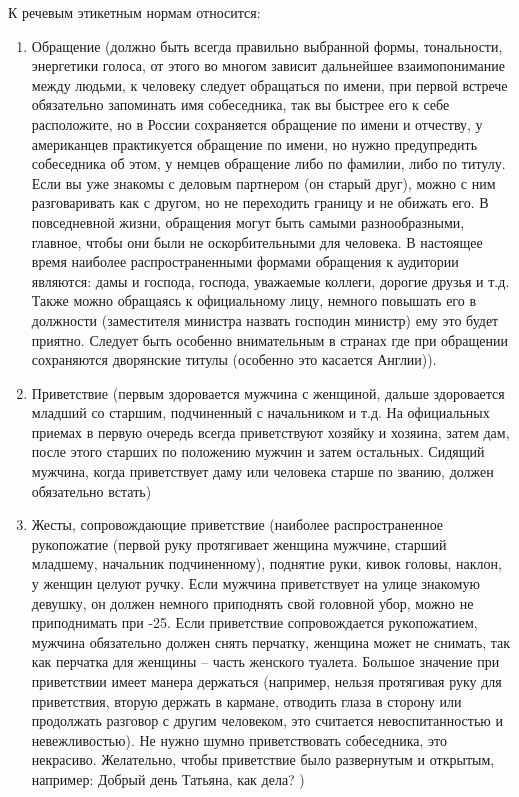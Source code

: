 К речевым этикетным нормам относится:
\begin{enumerate}
\item Обращение (должно быть всегда правильно выбранной формы, тональности, энергетики голоса, от этого во многом зависит дальнейшее взаимопонимание между людьми, к человеку следует обращаться по имени, при первой встрече обязательно запоминать имя собеседника, так вы быстрее его к себе расположите, но в России сохраняется обращение по имени и отчеству, у американцев практикуется обращение по имени, но нужно предупредить собеседника об этом, у немцев обращение либо по фамилии, либо по титулу. Если вы уже знакомы с деловым партнером (он старый друг), можно с ним разговаривать как с другом, но не переходить границу и не обижать его. В повседневной жизни, обращения могут быть самыми разнообразными, главное, чтобы они были не оскорбительными для человека. В настоящее время наиболее распространенными формами обращения к аудитории являются: дамы и господа, господа, уважаемые коллеги, дорогие друзья и т.д. Также можно обращаясь к официальному лицу, немного повышать его в должности (заместителя министра назвать господин министр) ему это будет приятно. Следует быть особенно внимательным в странах где при обращении сохраняются дворянские титулы (особенно это касается Англии)).
\item Приветствие (первым здоровается мужчина с женщиной, дальше здоровается младший со старшим, подчиненный с начальником и т.д. На официальных приемах в первую очередь всегда приветствуют хозяйку и хозяина, затем дам, после этого старших по положению мужчин и затем остальных. Сидящий мужчина, когда приветствует даму или человека старше по званию, должен обязательно встать)
\item Жесты, сопровождающие приветствие (наиболее распространенное рукопожатие (первой руку протягивает женщина мужчине, старший младшему, начальник подчиненному), поднятие руки, кивок головы, наклон, у женщин целуют ручку. Если мужчина приветствует на улице знакомую девушку, он должен немного приподнять свой головной убор, можно не приподнимать при -25. Если приветствие сопровождается рукопожатием, мужчина обязательно должен снять перчатку, женщина может не снимать, так как перчатка для женщины – часть женского туалета. Большое значение при приветствии имеет манера держаться (например, нельзя протягивая руку для приветствия, вторую держать в кармане, отводить глаза в сторону или продолжать разговор с другим человеком, это считается невоспитанностью и невежливостью). Не нужно шумно приветствовать собеседника, это некрасиво. Желательно, чтобы приветствие было развернутым и открытым, например: Добрый день Татьяна, как дела? )

\end{enumerate}
